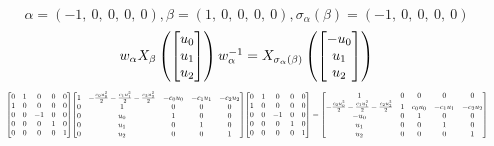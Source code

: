 \documentclass[11pt]{article}
\theoremstyle{definition}
\begin{document}
\[
\alpha = \left( -1, \  0, \  0, \  0, \  0\right), \beta = \left( 1, \  0, \  0, \  0, \  0\right), \sigma_{\alpha}(\beta) = \left( -1, \  0, \  0, \  0, \  0\right)
\]
\[
\scaletoalign{\textwidth}{w_{\alpha} X_{\beta}\left(\left[\begin{matrix}u_{0}\\u_{1}\\u_{2}\end{matrix}\right]\right) w_{\alpha}^{-1} = X_{\sigma_{\alpha}\left(\beta\right)}\left(\left[\begin{matrix}- u_{0}\\u_{1}\\u_{2}\end{matrix}\right]\right)}
\]
\[
\scaletoalign{\textwidth}{{\left[\begin{matrix}0 & 1 & 0 & 0 & 0\\1 & 0 & 0 & 0 & 0\\0 & 0 & -1 & 0 & 0\\0 & 0 & 0 & 1 & 0\\0 & 0 & 0 & 0 & 1\end{matrix}\right]} {\left[\begin{matrix}1 & - \frac{c_{0} u_{0}^{2}}{2} - \frac{c_{1} u_{1}^{2}}{2} - \frac{c_{2} u_{2}^{2}}{2} & - c_{0} u_{0} & - c_{1} u_{1} & - c_{2} u_{2}\\0 & 1 & 0 & 0 & 0\\0 & u_{0} & 1 & 0 & 0\\0 & u_{1} & 0 & 1 & 0\\0 & u_{2} & 0 & 0 & 1\end{matrix}\right]} {\left[\begin{matrix}0 & 1 & 0 & 0 & 0\\1 & 0 & 0 & 0 & 0\\0 & 0 & -1 & 0 & 0\\0 & 0 & 0 & 1 & 0\\0 & 0 & 0 & 0 & 1\end{matrix}\right]} = {\left[\begin{matrix}1 & 0 & 0 & 0 & 0\\- \frac{c_{0} u_{0}^{2}}{2} - \frac{c_{1} u_{1}^{2}}{2} - \frac{c_{2} u_{2}^{2}}{2} & 1 & c_{0} u_{0} & - c_{1} u_{1} & - c_{2} u_{2}\\- u_{0} & 0 & 1 & 0 & 0\\u_{1} & 0 & 0 & 1 & 0\\u_{2} & 0 & 0 & 0 & 1\end{matrix}\right]}}
\]
\end{document}
